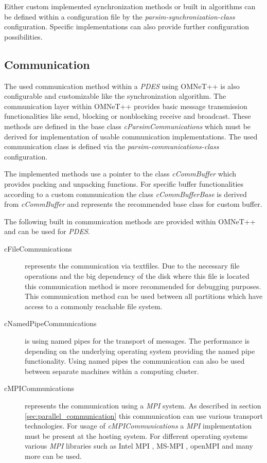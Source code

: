 Either custom implemented synchronization methods or built in algorithms can be defined within a configuration file by the \emph{parsim-synchronization-class} configuration.
Specific implementations can also provide further configuration possibilities. \cite[section 16.3.5]{omnet_manual}

\subsection{Communication}
\label{sec:parallel_omnet_comm}
The used communication method within a \emph{PDES} using OMNeT++ is also configurable and customizable like the synchronization algorithm.
The communication layer within OMNeT++ provides basic message transmission functionalities like send, blocking or nonblocking receive and broadcast.
These methods are defined in the base class \emph{cParsimCommunications} which must be derived for implementation of usable communication implementations. 
The used communication class is defined via the \emph{parsim-communications-class} configuration. \cite[section 16.3.5]{omnet_manual}

The implemented methods use a pointer to the class \emph{cCommBuffer} which provides packing and unpacking functions.
For specific buffer functionalities according to a custom communication the class \emph{cCommBufferBase} is derived from \emph{cCommBuffer} and represents the recommended base class for custom buffer. \cite{omnet_par_api}

The following built in communication methods are provided within OMNeT++ and can be used for \emph{PDES}. \cite[section 16.3.5]{omnet_manual} \cite{omnet_par_api}

\begin{description}
    \item[cFileCommunications] represents the communication via textfiles.
    Due to the necessary file operations and the big dependency of the disk where this file is located this communication method is more recommended for debugging purposes.
    This communication method can be used between all partitions which have access to a commonly reachable file system.
    \item[cNamedPipeCommunications] is using named pipes for the transport of messages.
    The performance is depending on the underlying operating system providing the named pipe functionality.
    Using named pipes the communication can also be used between separate machines within a computing cluster.
    \item[cMPICommunications] represents the communication using a \emph{MPI} system.
    As described in section \ref{sec:parallel_communication} this communication can use various transport technologies.
    For usage of \emph{cMPICommunications} a \emph{MPI} implementation must be present at the hosting system.
    For different operating systems various \emph{MPI} libraries such as Intel MPI \cite{intelmpi_hp}, MS-MPI \cite{msmpi_hp}, openMPI \cite{openmpi_hp} and many more can be used.
\end{description}


